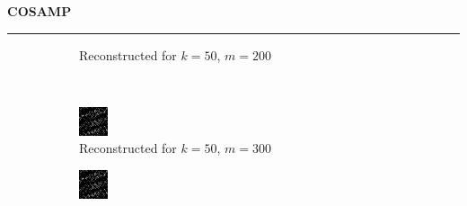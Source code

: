 \documentclass[a4paper,12pt]{article}
\newenvironment{solution}[2][]{%
    \begin{mdframed}[linecolor=blue!70!black, linewidth=2pt, roundcorner=10pt, backgroundcolor=yellow!10!white, skipabove=12pt, skipbelow=12pt]%
        \textbf{\large #2}
        \par\noindent\rule{\textwidth}{0.4pt}
}{
    \end{mdframed}
}
\begin{document}
\begin{solution}{COSAMP}
\begin{figure}[H]
\begin{subfigure}[t]{0.23\textwidth}
            \caption{Reconstructed for $k = 50$, $m = 200$}
        \end{subfigure}\\
        \begin{subfigure}[t]{0.23\textwidth}
            \centering
            \includegraphics[width=\textwidth]{../images/cosamp/Reconstructed_k_50_m_300.png}
            \caption{Reconstructed for $k = 50$, $m = 300$}
        \end{subfigure}
        \begin{subfigure}[t]{0.23\textwidth}
            \centering
            \includegraphics[width=\textwidth]{../images/cosamp/Reconstructed_k_50_m_400.png}

\end{subfigure}
\end{figure}
\end{solution}
\end{document}
